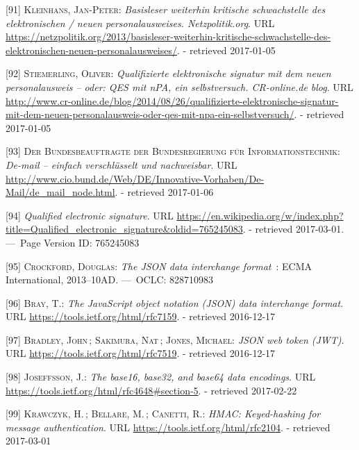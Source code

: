 \documentclass[12pt,english,a4paper,titlepage,cleardoublepage=empty,dottedtoc]{report}
\begin{document}
\hypertarget{ref-web_2013_npa-sicherheitsdefizit}{}
{[}91{]} \textsc{Kleinhans, Jan-Peter}: \emph{Basisleser weiterhin
kritische schwachstelle des elektronischen / neuen personalausweises.
Netzpolitik.org}. URL
\url{https://netzpolitik.org/2013/basisleser-weiterhin-kritische-schwachstelle-des-elektronischen-neuen-personalausweises/}.
- retrieved 2017-01-05

\hypertarget{ref-web_2014_test-qes-support-in-npa}{}
{[}92{]} \textsc{Stiemerling, Oliver}: \emph{Qualifizierte elektronische
signatur mit dem neuen personalausweis -- oder: QES mit nPA, ein
selbstversuch. CR-online.de blog}. URL
\url{http://www.cr-online.de/blog/2014/08/26/qualifizierte-elektronische-signatur-mit-dem-neuen-personalausweis-oder-qes-mit-npa-ein-selbstversuch/}.
- retrieved 2017-01-05

\hypertarget{ref-web_2017_about-de-mail}{}
{[}93{]} \textsc{Der Bundesbeauftragte der Bundesregierung für
Informationstechnik}: \emph{De-mail -- einfach verschlüsselt und
nachweisbar}. URL
\url{http://www.cio.bund.de/Web/DE/Innovative-Vorhaben/De-Mail/de_mail_node.html}.
- retrieved 2017-01-06

\hypertarget{ref-web_2017_wikipedia_qes}{}
{[}94{]} \emph{Qualified electronic signature}. URL
\url{https://en.wikipedia.org/w/index.php?title=Qualified_electronic_signature\&oldid=765245083}.
- retrieved 2017-03-01. ---~Page Version ID: 765245083

\hypertarget{ref-web_spec_json}{}
{[}95{]} \textsc{Crockford, Douglas}: \emph{The JSON data interchange
format}~: ECMA International, 2013--10AD. ---~OCLC: 828710983

\hypertarget{ref-web_rfc_json}{}
{[}96{]} \textsc{Bray, T.}: \emph{The JavaScript object notation (JSON)
data interchange format}. URL \url{https://tools.ietf.org/html/rfc7159}.
- retrieved 2016-12-17

\hypertarget{ref-web_spec_json-web-token}{}
{[}97{]} \textsc{Bradley, John}\,; \textsc{Sakimura, Nat}\,;
\textsc{Jones, Michael}: \emph{JSON web token (JWT)}. URL
\url{https://tools.ietf.org/html/rfc7519}. - retrieved 2016-12-17

\hypertarget{ref-web_spec_base64url}{}
{[}98{]} \textsc{Joseffsson, J.}: \emph{The base16, base32, and base64
data encodings}. URL
\url{https://tools.ietf.org/html/rfc4648\#section-5}. - retrieved
2017-02-22

\hypertarget{ref-web_spec_hmac}{}
{[}99{]} \textsc{Krawczyk, H.}\,; \textsc{Bellare, M.}\,;
\textsc{Canetti, R.}: \emph{HMAC: Keyed-hashing for message
authentication}. URL \url{https://tools.ietf.org/html/rfc2104}. -
retrieved 2017-03-01
\end{document}
